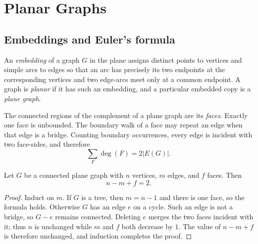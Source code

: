 \chapter{Planar Graphs}

\section{Embeddings and Euler's formula}

\begin{notedefinition}
An \emph{embedding} of a graph $G$ in the plane assigns distinct points to
vertices and simple arcs to edges so that an arc has precisely its two
endpoints at the corresponding vertices and two edge-arcs meet only at a
common endpoint.  A graph is \emph{planar} if it has such an embedding, and a
particular embedded copy is a \emph{plane graph}.
\end{notedefinition}

\begin{noteremark}[terminology]
The connected regions of the complement of a plane graph are its
\emph{faces}.  Exactly one face is unbounded.  The boundary walk of a face may
repeat an edge when that edge is a bridge.  Counting boundary occurrences,
every edge is incident with two face-sides, and therefore
\[
  \sum_{F}\deg(F)=2|E(G)|.
\]
\end{noteremark}
\begin{notetheorem}
Let $G$ be a connected plane graph with $n$ vertices, $m$ edges, and $f$
faces.  Then
\[
  n-m+f=2.
\]
\end{notetheorem}
\begin{proof}
Induct on $m$.  If $G$ is a tree, then $m=n-1$ and there is one face, so the
formula holds.  Otherwise $G$ has an edge $e$ on a cycle.  Such an edge is not
a bridge, so $G-e$ remains connected.  Deleting $e$ merges the two faces
incident with it; thus $n$ is unchanged while $m$ and $f$ both decrease by
$1$.  The value of $n-m+f$ is therefore unchanged, and induction completes
the proof.
\end{proof}

